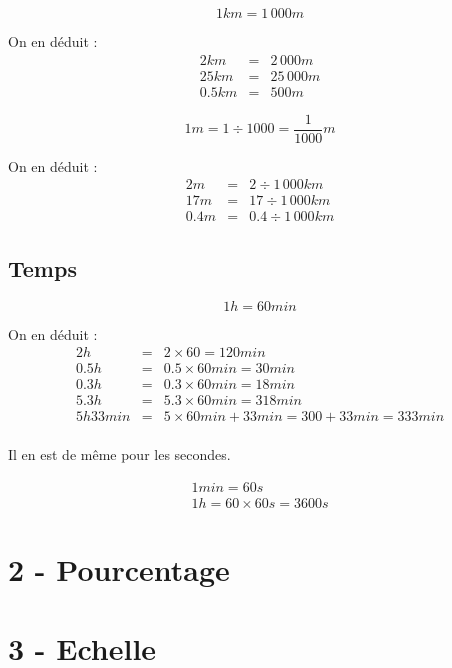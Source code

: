 \documentclass[12pt]{article}
\begin{document}
$$1 km = 1\,000m$$

On en déduit : 
	\begin{eqnarray*}
  2km &=& 2 \,000m \\
  25km &=& 25 \, 000m \\
  0.5 km &=& 500m
\end{eqnarray*}

$$1m = 1\div 1000 = \frac{1}{1000} m$$

On en déduit : 
	\begin{eqnarray*}
  2m &=& 2 \div 1\,000 km \\
  17m &=& 17 \div 1\, 000 km \\
  0.4 m &=& 0.4 \div 1\, 000 km
\end{eqnarray*}

\subsection*{Temps}

$$ 1h = 60min $$

On en déduit : 
	\begin{eqnarray*}
  2h &=& 2 \times 60 = 120 min \\
  0.5h &=& 0.5 \times 60min = 30 min \\
  0.3h &=& 0.3 \times 60min = 18 min \\
  5.3h &=& 5.3 \times 60min = 318 min \\
  5h33min &=& 5 \times 60min + 33min = 300 + 33 min = 333min\\
\end{eqnarray*}

Il en est de même pour les secondes.

\begin{eqnarray*}
  1min = 60s \\
  1h = 60 \times 60s = 3600s
\end{eqnarray*}

\section*{2 - Pourcentage}

\section*{3 - Echelle}
\end{document}
